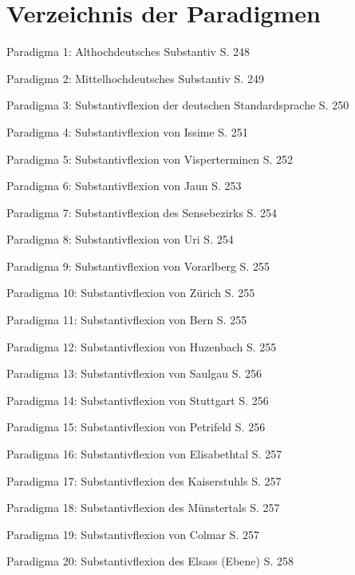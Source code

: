 \chapter{Verzeichnis der Paradigmen}\label{appendix5}

Paradigma 1: Althochdeutsches Substantiv \citep[183–217]{Braune2004}  S. 248

Paradigma 2: Mittelhochdeutsches Substantiv \citep[183–199]{Paul2007}  S. 249

Paradigma 3: Substantivflexion der deutschen Standardsprache \citep[158–169]{Eisenberg2006}  S. 250

Paradigma 4: Substantivflexion von Issime \citep[144–205]{Zürrer1999}  S. 251

Paradigma 5: Substantivflexion von Visperterminen \citep[119–134]{Wipf1911}  S. 252

Paradigma 6: Substantivflexion von Jaun \citep[255–272]{Stucki1917}  S. 253

Paradigma 7: Substantivflexion des Sensebezirks \citealt[179–190]{Henzen1927}  S. 254

Paradigma 8: Substantivflexion von Uri \citep[173–185]{Clauß1929}  S. 254

Paradigma 9: Substantivflexion von Vorarlberg \citep[231–261]{Jutz1925}  S. 255

Paradigma 10: Substantivflexion von Zürich \citep[108–119]{Weber1987}  S. 255

Paradigma 11: Substantivflexion von Bern \citep[82–90]{Marti1985}  S. 255

Paradigma 12: Substantivflexion von Huzenbach \citep[92–98]{Baur1967}  S. 255

Paradigma 13: Substantivflexion von Saulgau \citep[100–109]{Raichle1932}  S. 256

Paradigma 14: Substantivflexion von Stuttgart \citep[149–152]{Frey1975}  S. 256

Paradigma 15: Substantivflexion von Petrifeld \citep[59–62]{Moser1937}  S. 256

Paradigma 16: Substantivflexion von Elisabethtal \citep[50–52]{Žirmunskij1928/29}  S. 257

Paradigma 17: Substantivflexion des Kaiserstuhls \citep[359–373]{Noth1993}  S. 257

Paradigma 18: Substantivflexion des Münstertals \citep[40–44]{Mankel1886}  S. 257

Paradigma 19: Substantivflexion von Colmar \citep[71–76]{Henry1900}  S. 257

Paradigma 20: Substantivflexion des Elsass (Ebene) \citep[25–71]{Beyer1963}  S. 258

